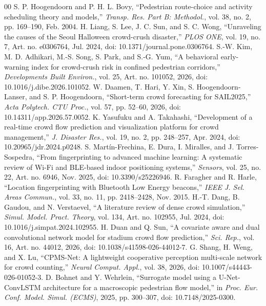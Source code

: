\documentclass[conference,a4paper]{IEEEtran}
\begin{document}
\begin{thebibliography}{00}
 S. P. Hoogendoorn and P. H. L. Bovy, ``Pedestrian route-choice and activity scheduling theory and models,'' \emph{Transp. Res. Part B: Methodol.}, vol. 38, no. 2, pp. 169--190, Feb. 2004.
 H. Liang, S. Lee, J. C. Sun, and S. C. Wong, ``Unraveling the causes of the Seoul Halloween crowd-crush disaster,'' \emph{PLOS ONE}, vol. 19, no. 7, Art. no. e0306764, Jul. 2024, doi: 10.1371/journal.pone.0306764.
 S.-W. Kim, M. D. Adhikari, M.-S. Song, S. Park, and S.-G. Yum, ``A behavioral early-warning index for crowd-crush risk in confined pedestrian corridors,'' \emph{Developments Built Environ.}, vol. 25, Art. no. 101052, 2026, doi: 10.1016/j.dibe.2026.101052.
 W. Daamen, T. Hari, Y. Xin, S. Hoogendoorn-Lanser, and S. P. Hoogendoorn, ``Short-term crowd forecasting for SAIL2025,'' \emph{Acta Polytech. CTU Proc.}, vol. 57, pp. 52--60, 2026, doi: 10.14311/app.2026.57.0052.
 K. Yasufuku and A. Takahashi, ``Development of a real-time crowd flow prediction and visualization platform for crowd management,'' \emph{J. Disaster Res.}, vol. 19, no. 2, pp. 248--257, Apr. 2024, doi: 10.20965/jdr.2024.p0248.
 S. Mart\'in-Frechina, E. Dura, I. Miralles, and J. Torres-Sospedra, ``From fingerprinting to advanced machine learning: A systematic review of Wi-Fi and BLE-based indoor positioning systems,'' \emph{Sensors}, vol. 25, no. 22, Art. no. 6946, Nov. 2025, doi: 10.3390/s25226946.
 R. Faragher and R. Harle, ``Location fingerprinting with Bluetooth Low Energy beacons,'' \emph{IEEE J. Sel. Areas Commun.}, vol. 33, no. 11, pp. 2418--2428, Nov. 2015.
 H.-T. Dang, B. Gaudou, and N. Verstaevel, ``A literature review of dense crowd simulation,'' \emph{Simul. Model. Pract. Theory}, vol. 134, Art. no. 102955, Jul. 2024, doi: 10.1016/j.simpat.2024.102955.
 H. Duan and Q. Sun, ``A covariate aware and dual convolutional network model for stadium crowd flow prediction,'' \emph{Sci. Rep.}, vol. 16, Art. no. 44012, 2026, doi: 10.1038/s41598-026-44012-7.
 G. Shang, H. Weng, and X. Lu, ``CPMS-Net: A lightweight cooperative perception multi-scale network for crowd counting,'' \emph{Neural Comput. Appl.}, vol. 38, 2026, doi: 10.1007/s44443-026-01052-3.
 D. Bohnet and Y. Wehrlein, ``Surrogate model using a U-Net-ConvLSTM architecture for a macroscopic pedestrian flow model,'' in \emph{Proc. Eur. Conf. Model. Simul. (ECMS)}, 2025, pp. 300--307, doi: 10.7148/2025-0300.

\end{thebibliography}
\end{document}

